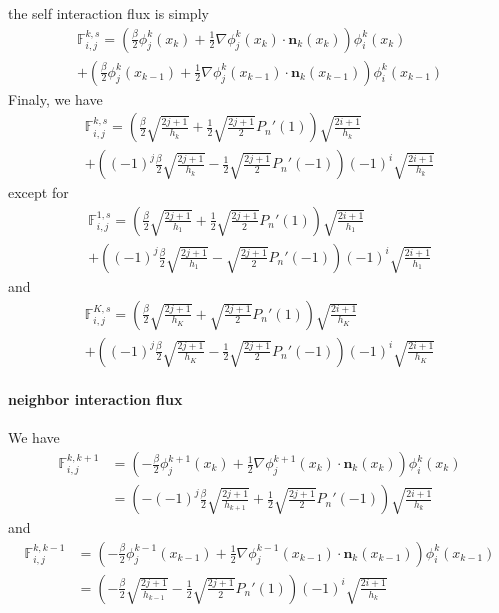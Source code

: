 \documentclass[a4paper,10pt]{article}
\begin{document}
the self interaction flux is simply
\begin{multline*}
 \mathbb{F}_{i,j}^{k,s} 
 = \left( \frac{\beta}{2} \phi_j^k(x_k) + \frac{1}{2} \nabla \phi_j^k(x_k) \cdot \mathbf{n}_k(x_k) 
\right) \phi_i^k(x_k) \\
+ \left( \frac{\beta}{2} \phi_j^k(x_{k-1}) + \frac{1}{2} \nabla \phi_j^k(x_{k-1}) \cdot 
\mathbf{n}_k(x_{k-1}) \right) \phi_i^k(x_{k-1})
\end{multline*}
Finaly, we have
\begin{multline*}
 \mathbb{F}_{i,j}^{k,s} = \left( \frac{\beta}{2} \sqrt{\frac{2j+1}{h_k}} + \frac{1}{2} 
\sqrt{\frac{2j+1}{2}}P_{n}'(1) \right) \sqrt{\frac{2i+1}{h_k}} \\
+ \left( (-1)^j \frac{\beta}{2} \sqrt{\frac{2j+1}{h_k}} - \frac{1}{2} \sqrt{\frac{2j+1}{2}} 
P_{n}'(-1) \right)(-1)^i \sqrt{\frac{2i+1}{h_k}} 
\end{multline*}
except for
\begin{multline*}
 \mathbb{F}_{i,j}^{1,s} = \left( \frac{\beta}{2} \sqrt{\frac{2j+1}{h_1}} + \frac{1}{2} 
\sqrt{\frac{2j+1}{2}}P_{n}'(1) \right) \sqrt{\frac{2i+1}{h_1}} \\
+ \left( (-1)^j \frac{\beta}{2} \sqrt{\frac{2j+1}{h_1}} - \sqrt{\frac{2j+1}{2}} 
P_{n}'(-1) \right)(-1)^i \sqrt{\frac{2i+1}{h_1}} 
\end{multline*}
and
\begin{multline*}
 \mathbb{F}_{i,j}^{K,s} = \left( \frac{\beta}{2} \sqrt{\frac{2j+1}{h_K}} + 
\sqrt{\frac{2j+1}{2}}P_{n}'(1) \right) \sqrt{\frac{2i+1}{h_K}} \\
+ \left( (-1)^j \frac{\beta}{2} \sqrt{\frac{2j+1}{h_K}} - \frac{1}{2} \sqrt{\frac{2j+1}{2}} 
P_{n}'(-1) \right)(-1)^i \sqrt{\frac{2i+1}{h_K}} 
\end{multline*}

\paragraph{neighbor interaction flux}

We have
\begin{align*} 
\mathbb{F}_{i,j}^{k,k+1} &=
\left( -\frac{\beta}{2} \phi_j^{k+1}(x_k) + \frac{1}{2} \nabla \phi_j^{k+1}(x_k) \cdot 
\mathbf{n}_k(x_k) \right) \phi_i^k(x_k)\\
&= \left(-(-1)^j \frac{\beta}{2} \sqrt{\frac{2j+1}{h_{k+1}}} + \frac{1}{2} 
\sqrt{\frac{2j+1}{2}}P_{n}'(-1) \right) \sqrt{\frac{2i+1}{h_k}}
\end{align*}
and
\begin{align*} 
\mathbb{F}_{i,j}^{k,k-1} &=
\left( -\frac{\beta}{2} \phi_j^{k-1}(x_{k-1}) + \frac{1}{2} \nabla \phi_j^{k-1}(x_{k-1}) \cdot 
\mathbf{n}_k(x_{k-1}) \right) \phi_i^k(x_{k-1})\\
&= \left(-\frac{\beta}{2} \sqrt{\frac{2j+1}{h_{k-1}}} - \frac{1}{2} 
\sqrt{\frac{2j+1}{2}}P_{n}'(1) \right) (-1)^i \sqrt{\frac{2i+1}{h_k}}
\end{align*}
\end{document}
